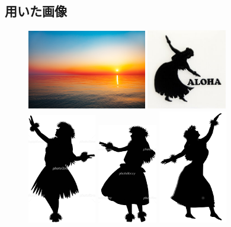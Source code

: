 \documentclass{jsarticle}
\begin{document}
\subsection{用いた画像}
\begin{figure}[htbp]
\begin{center}
\includegraphics[width=52mm]{sunset.jpg}  
\includegraphics[width=35mm]{hawaii2.jpg}  \\
\includegraphics[width=30mm]{hawaii3.png}  
\includegraphics[width=26mm]{hawaii4.png}  
\includegraphics[width=30mm]{hawaii5.png}  
\end{center}
\end{figure}
\end{document}
